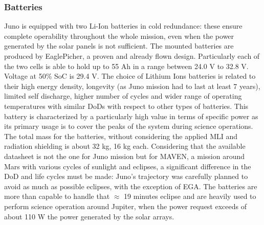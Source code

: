 \subsubsection{Batteries}
\label{subsubsec:Batteries}
Juno is equipped with two Li-Ion batteries in cold redundance: these ensure complete operability throughout the whole mission, even when the power generated by the solar panels is not sufficient.
The mounted batteries are produced by EaglePicher, a proven and already flown design.\cite{batteries_juno} Particularly each of the two cells is able to hold up to 55 Ah in a range between 24.0 V to 32.8 V. Voltage at 50\% SoC is 29.4 V.\cite{solar_panels_coef} The choice of Lithium Ions batteries is related to their high energy density, longevity (as Juno mission had to last at least 7 years), limited self discharge, higher number of cycles and wider range of operating temperatures with similar DoDs with respect to other types of batteries.
This battery is characterized by a particularly high value in terms of specific power as its primary usage is to cover the peaks of the system during science operations.
The total mass for the batteries, without considering the applied MLI and radiation shielding is about 32 kg, 16 kg each. Considering that the available datasheet \cite{batteries_juno} is not the one for Juno mission but for MAVEN, a mission around Mars with various cycles of sunlight and eclipses, a significant difference in the DoD and life cycles must be made: Juno's trajectory was carefully planned to avoid as much as possible eclipses, with the exception of EGA. The batteries are more than capable to handle that $\approx$ 19 minutes eclipse \cite{juno_inner} and are heavily used to perform science operation around Jupiter, when the power request exceeds of about 110 W the power generated by the solar arrays.




